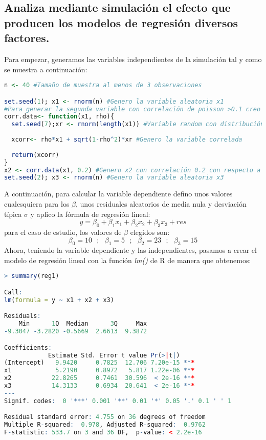 \documentclass[12pt,a4paper]{article}
\begin{document}
\subsection{Analiza mediante simulación el efecto que producen los modelos de regresión diversos factores.}
Para empezar, generamos las variables independientes de la simulación tal y como se muestra a continuación:
\begin{lstlisting}[language=R, caption = Generación de variables independientes, label =cod:1]
n <- 40 #Tamaño de muestra al menos de 3 observaciones

set.seed(1); x1 <- rnorm(n) #Genero la variable aleatoria x1
#Para generar la segunda variable con correlación de poisson >0.1 creo la función
corr.data<- function(x1, rho){
  set.seed(7);xr <- rnorm(length(x1)) #Variable random con distribución normal
  
  xcorr<- rho*x1 + sqrt(1-rho^2)*xr #Genero la variable correlada
  
  return(xcorr)
}
x2 <- corr.data(x1, 0.2) #Genero x2 con correlación 0.2 con respecto a x1
set.seed(2); x3 <- rnorm(n) #Genero la variable aleatoria x3

\end{lstlisting}
A continuación, para calcular la variable dependiente defino unos valores cualesquiera para los $\beta$, unos residuales aleatorios de media nula y desviación típica $\sigma$ y aplico la fórmula de regresión lineal:
\begin{equation}
    y = \beta_0 + \beta_1 x_1 + \beta_2 x_2 + \beta_3 x_3 + res
\end{equation}
para el caso de estudio, los valores de $\beta$ elegidos son:
\begin{equation*}
    \beta_0 = 10 \ \ \ ;\ \ \ \beta_1 = 5 \ \ \ ;\ \ \ \beta_2 = 23 \ \ \ ;\ \ \  \beta_3 = 15
\end{equation*}
Ahora, teniendo la variable dependiente y las independientes, pasamos a crear el modelo de regresión lineal con la función \textit{lm()} de R de manera que obtenemos:
\begin{lstlisting}[language=R, caption = Resultado de la regresión lineal, label =cod:2]
> summary(reg1)

Call:
lm(formula = y ~ x1 + x2 + x3)

Residuals:
    Min      1Q  Median      3Q     Max 
-9.3047 -3.2820 -0.5669  2.6613  9.3872 

Coefficients:
            Estimate Std. Error t value Pr(>|t|)    
(Intercept)   9.9420     0.7825  12.706 7.20e-15 ***
x1            5.2190     0.8972   5.817 1.22e-06 ***
x2           22.8265     0.7461  30.596  < 2e-16 ***
x3           14.3133     0.6934  20.641  < 2e-16 ***
---
Signif. codes:  0 '***' 0.001 '**' 0.01 '*' 0.05 '.' 0.1 ' ' 1

Residual standard error: 4.755 on 36 degrees of freedom
Multiple R-squared:  0.978,	Adjusted R-squared:  0.9762 
F-statistic: 533.7 on 3 and 36 DF,  p-value: < 2.2e-16
\end{lstlisting}
\end{document}
